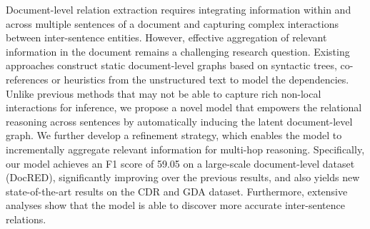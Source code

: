 Document-level relation extraction requires integrating information within and across multiple sentences of a document and capturing complex interactions between inter-sentence entities. However, effective aggregation of relevant information in the document remains a challenging research question. Existing approaches construct static document-level graphs based on syntactic trees, co-references or heuristics from the unstructured text to model the dependencies. Unlike previous methods that may not be able to capture rich non-local interactions for inference, we propose a novel model that empowers the relational reasoning across sentences by automatically inducing the latent document-level graph. We further develop a refinement strategy, which enables the model to incrementally aggregate relevant information for multi-hop reasoning. Specifically, our model achieves an F1 score of 59.05 on a large-scale document-level dataset (DocRED), significantly improving over the previous results, and also yields new state-of-the-art results on the CDR and GDA dataset. Furthermore, extensive analyses show that the model is able to discover more accurate inter-sentence relations.
